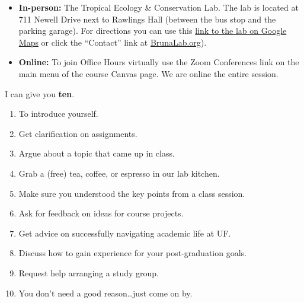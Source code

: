 \documentclass[
  10pt,
  letterpaper,
  oneside,
  open=any]{scrbook}
\providecommand{\tightlist}{%
  \setlength{\itemsep}{0pt}\setlength{\parskip}{0pt}}\usepackage{longtable,booktabs,array}
\begin{document}
\begin{itemize}
\item
  \textbf{In-person:} The Tropical Ecology \& Conservation Lab. The lab
  is located at 711 Newell Drive next to Rawlings Hall (between the bus
  stop and the parking garage). For directions you can use this
  \href{https://maps.app.goo.gl/xo13vJmj8WXAivpZ9}{link to the lab on
  Google Maps} or click the ``Contact'' link at
  \href{http://brunalab.org}{BrunaLab.org}).
\item
  \textbf{Online:} To join Office Hours virtually use the Zoom
  Conferences link on the main menu of the course Canvas page. We are
  online the entire session.
\end{itemize}

\begin{tcolorbox}[enhanced jigsaw, toptitle=1mm, coltitle=black, titlerule=0mm, bottomtitle=1mm, colbacktitle=quarto-callout-tip-color!10!white, title=\textcolor{quarto-callout-tip-color}{\faLightbulb}\hspace{0.5em}{Can you give me \textbf{one good reason} why I should go to Office
Hours?}, opacitybacktitle=0.6, opacityback=0, colframe=quarto-callout-tip-color-frame, leftrule=.75mm, arc=.35mm, colback=white, bottomrule=.15mm, rightrule=.15mm, toprule=.15mm, left=2mm, breakable]

I can give you \textbf{ten}.

\begin{enumerate}
\def\labelenumi{\arabic{enumi}.}
\tightlist
\item
  To introduce yourself.
\item
  Get clarification on assignments.
\item
  Argue about a topic that came up in class.
\item
  Grab a (free) tea, coffee, or espresso in our lab kitchen.
\item
  Make sure you understood the key points from a class session.
\item
  Ask for feedback on ideas for course projects.
\item
  Get advice on successfully navigating academic life at UF.
\item
  Discuss how to gain experience for your post-graduation goals.
\item
  Request help arranging a study group.
\item
  You don't need a good reason\ldots just come on by.
\end{enumerate}

\end{tcolorbox}
\end{document}
